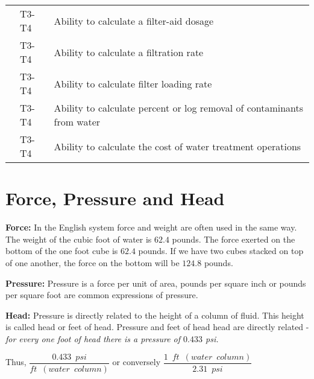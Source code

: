 \begin{table}[H]
\begin{tabular}{| m{1cm} | m{1cm} | m{12cm} |}
\multicolumn{1}{l|}{} & \multicolumn{1}{l|}{T3-T4} & Ability to calculate   a filter-aid dosage                                   \\ \cline{2-3} 
\multicolumn{1}{l|}{} & \multicolumn{1}{l|}{T3-T4} & Ability to calculate   a filtration rate                                     \\ \cline{2-3} 
\multicolumn{1}{l|}{} & \multicolumn{1}{l|}{T3-T4} & Ability to calculate   filter loading rate                                   \\ \cline{2-3} 
\multicolumn{1}{l|}{} & \multicolumn{1}{l|}{T3-T4} & Ability to calculate   percent or log removal of contaminants from water     \\ \cline{2-3} 
\multicolumn{1}{l|}{} & \multicolumn{1}{l|}{T3-T4} & Ability to calculate   the cost of water treatment operations                \\ \cline{2-3} 
\end{tabular}
\end{table}
\newpage


\section{Force, Pressure and Head} 

\textbf{Force:}  In the English system force and weight are often used in the same way. The weight of the cubic foot of water is $62.4$ pounds. The force exerted on the bottom of the one foot cube is $62.4$ pounds. If we have two cubes stacked on top of one another, the force on the bottom will be $124.8$ pounds.

\textbf{Pressure:} Pressure is a force per unit of area, pounds per square inch or pounds per square foot are common expressions of pressure. 

\textbf{Head:}  Pressure is directly related to the height of a column of fluid. This height is called head or feet of head. Pressure and feet of head head are directly related - \emph{for every one foot of head there is a pressure of $0.433$ psi.}

\vspace{0.2cm}
Thus, $\dfrac{0.433 \enspace psi}{ft \enspace (water \enspace column)}$ or conversely $\dfrac{1 \enspace ft \enspace (water \enspace column)}{2.31 \enspace psi}$\\
\\

